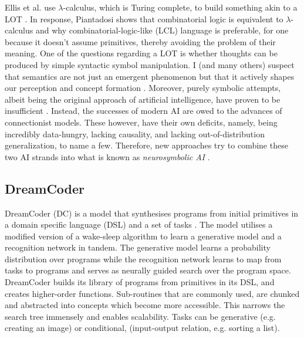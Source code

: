 Ellis et al. use $\lambda$-calculus, which is Turing complete, to build something akin to a LOT \cite{ellis_dreamcoder_2021}. In response, Piantadosi shows that combinatorial logic is equivalent to $\lambda$-calculus and why combinatorial-logic-like (LCL) language is preferable, for one because it doesn't assume primitives, thereby avoiding the problem of their meaning. 
One of the questions regarding a LOT is whether thoughts can be produced by simple syntactic symbol manipulation.
I (and many others) suspect that semantics are not just an emergent phenomenon but that it actively shapes our perception and concept formation \cite{santoro2021symbolic, hofstadter_gdel_1979}.
Moreover, purely symbolic attempts, albeit being the original approach of artificial intelligence, have proven to be insufficient \cite{garcez2020neurosymbolic}. Instead, the successes of modern AI are owed to the advances of connectionist models. These however, have their own deficits, namely, being incredibly data-hungry, lacking causality, and lacking out-of-distribution generalization, to name a few. Therefore, new approaches try to combine these two AI strands into what is known as \emph{neurosymbolic AI} \cite{garcez2020neurosymbolic}.


\subsection{DreamCoder}
DreamCoder (DC) is a model that synthesises programs from initial primitives in a domain specific language (DSL) and a set of tasks \cite{ellis_dreamcoder_2021}. The model utilises a modified version of a wake-sleep algorithm \cite{hinton1995wake} to learn a generative model and a recognition network in tandem. The generative model learns a probability distribution over programs while the recognition network learns to map from tasks to programs and serves as neurally guided search over the program space.
DreamCoder builds its library of programs from primitives in its DSL, and creates higher-order functions.
Sub-routines that are commonly used, are chunked and abstracted into concepts which become more accessible. This narrows the search tree immensely and enables scalability.
Tasks can be generative (e.g. creating an image) or conditional, (input-output relation, e.g. sorting a list).

